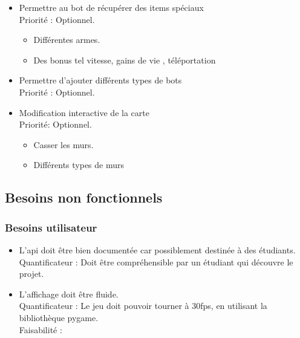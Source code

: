 \documentclass[french]{article}
\begin{document}
\begin{itemize}
        \item Permettre au bot de récupérer des items spéciaux \\
            Priorité : Optionnel.
            \begin{itemize}
                \item Différentes armes.
                \item Des bonus tel vitesse, gains de vie , téléportation \\
            \end{itemize}
            
        \item Permettre d'ajouter différents types de bots \\
            Priorité : Optionnel. \\
        
        \item Modification interactive de la carte \\
            Priorité: Optionnel.
             \begin{itemize}
                \item Casser les murs.
                \item Différents types de murs \\
            \end{itemize}
    \end{itemize}


\subsection{Besoins non fonctionnels}
\subsubsection{Besoins utilisateur}
    \begin{itemize}
        \item L'api doit être bien documentée car possiblement destinée à des étudiants.\\
            Quantificateur : Doit être compréhensible par un étudiant qui découvre le projet. \\

        \item L'affichage doit être fluide.\\
            Quantificateur : Le jeu doit pouvoir tourner à 30fps, en utilisant la bibliothèque pygame.\\
            Faisabilité : \\ %
            

    \end{itemize}
\end{document}
